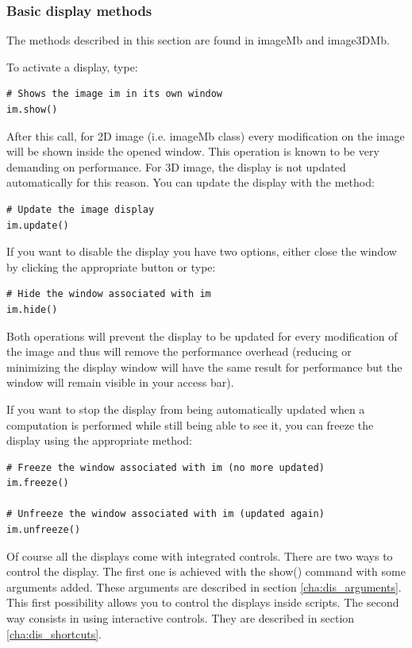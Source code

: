 \documentclass[a4paper,10pt,oneside]{article}
\begin{document}
\subsubsection{Basic display methods}

The methods described in this section are found in imageMb and image3DMb.

To activate a display, type:

\lstset{language=Python}
\begin{lstlisting}
# Shows the image im in its own window
im.show()
\end{lstlisting}

After this call, for 2D image (i.e. imageMb class) every modification on the
image will be shown inside the opened window. This operation is known to be
very demanding on performance. For 3D image, the display is not updated
automatically for this reason. You can update the display with the method:

\lstset{language=Python}
\begin{lstlisting}
# Update the image display
im.update()
\end{lstlisting}

If you want to disable the display you have two options, either close the window
by clicking the appropriate button or type:

\lstset{language=Python}
\begin{lstlisting}
# Hide the window associated with im
im.hide()
\end{lstlisting}

Both operations will prevent the display to be updated for every modification of
the image and thus will remove the performance overhead (reducing or minimizing 
the display window will have the same result for performance but the window will
remain visible in your access bar).

If you want to stop the display from being automatically updated when a 
computation is performed while still being able to see it, you can freeze the 
display using the appropriate method:

\lstset{language=Python}
\begin{lstlisting}
# Freeze the window associated with im (no more updated)
im.freeze()

# Unfreeze the window associated with im (updated again)
im.unfreeze()
\end{lstlisting}

Of course all the displays come with integrated controls. There are two ways to control
the display. The first one is achieved with the show() command with some arguments
added. These arguments are described in section \ref{cha:dis_arguments}. This
first possibility allows you to control the displays inside scripts. The second way
consists in using interactive controls. They are described in section \ref{cha:dis_shortcuts}.
\end{document}
